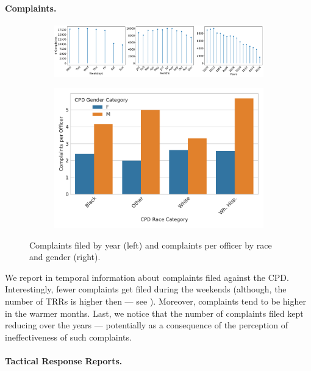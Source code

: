 \paragraph{Complaints.} 
\begin{figure}[t!] 
\begin{subfigure}{0.44\textwidth}
	\includegraphics[width=\textwidth, clip, trim= 970 0 0 0]{figs/complaints_times} 
\end{subfigure}
\begin{subfigure}{0.52\textwidth}
	\includegraphics[width=\textwidth]{figs/complaints} 
\end{subfigure}
	\caption{Complaints filed by year (left) and complaints per officer by race and gender (right).} \label{fig:complaints}
\end{figure}

We report in  temporal information about complaints filed against the CPD. Interestingly, fewer complaints get filed during the weekends (although, the number of TRRs is higher then --- see ). Moreover, complaints tend to be higher in the warmer months. Last, we notice that the number of complaints filed kept reducing over the years --- potentially as a consequence of the perception of ineffectiveness of such complaints.

\paragraph{Tactical Response Reports.}

